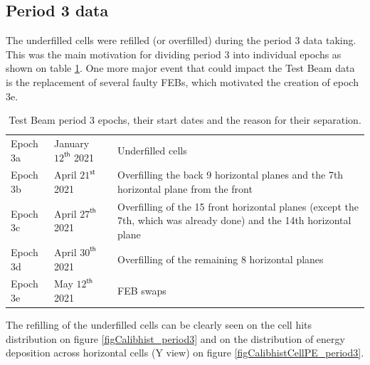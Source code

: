 \documentclass[12pt,a4paper]{article}
\begin{document}
\subsection{Period 3 data}
The underfilled cells were refilled (or overfilled) during the period 3 data taking. This was the main motivation for dividing period 3 into individual epochs as shown on table \ref{tabTestBeamPeriod3Epochs}. One more major event that could impact the Test Beam data is the replacement of several faulty FEBs, which motivated the creation of epoch 3e.

\begin{table}[!ht]
\centering
\def\arraystretch{1.4}
\begin{tabular}{m{} m{} m{}}
Epoch 3a & January $12^{\textsf{th}}$ 2021 & Underfilled cells\\
Epoch 3b & April $21^{\textsf{st}}$ 2021 & Overfilling the back 9 horizontal planes and the 7th horizontal plane from the front\\
Epoch 3c & April $27^{\textsf{th}}$ 2021 & Overfilling of the 15 front horizontal planes (except the 7th, which was already done) and the 14th horizontal plane\\
Epoch 3d & April $30^{\textsf{th}}$ 2021 & Overfilling of the remaining 8 horizontal planes\\
Epoch 3e & May $12^{\textsf{th}}$ 2021 & FEB swaps
\end{tabular}
\caption{Test Beam period 3 epochs, their start dates and the reason for their separation.}
\label{tabTestBeamPeriod3Epochs}
\end{table}

The refilling of the underfilled cells can be clearly seen on the cell hits distribution on figure \ref{figCalibhist_period3} and on the distribution of energy deposition across horizontal cells (Y view) on figure \ref{figCalibhistCellPE_period3}.
\end{document}

